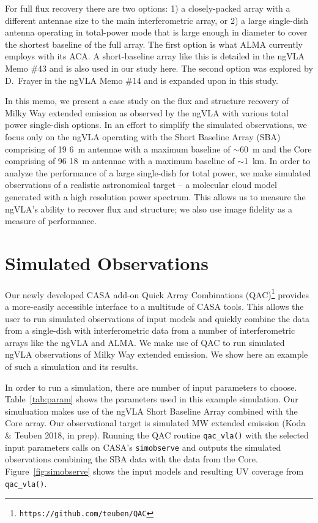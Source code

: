 \documentclass[12pt]{article}
\begin{document}
For full flux recovery there are two options: 1) a closely-packed array with a different antennae size to the main interferometric array, or 2) a large single-dish antenna operating in total-power mode that is large enough in diameter to cover the shortest baseline of the full array. The first option is what ALMA currently employs with its ACA. A short-baseline array like this is detailed in the ngVLA Memo \#43 and is also used in our study here. The second option was explored by D.~Frayer in the ngVLA Memo \#14 and is expanded upon in this study.

In this memo, we present a case study on the flux and structure recovery of Milky Way extended emission as observed by the ngVLA with various total power single-dish options. In an effort to simplify the simulated observations, we focus only on the ngVLA operating with the Short Baseline Array (SBA) comprising of 19 \SI{6}{\meter} antennae with a maximum baseline of $\sim$\SI{60}{\meter} and the Core comprising of 96 \SI{18}{\meter} antennae with a maximum baseline of $\sim$\SI{1}{\kilo\meter}. In order to analyze the performance of a large single-dish for total power, we make simulated observations of a realistic astronomical target -- a molecular cloud model generated with a high resolution power spectrum. This allows us to measure the ngVLA's ability to recover flux and structure; we also use image fidelity as a measure of performance. 

\section*{Simulated Observations}

Our newly developed CASA add-on Quick Array Combinations (QAC)\footnote{\texttt{https://github.com/teuben/QAC}} provides a more-easily accessible interface to a multitude of CASA tools. This allows the user to run simulated observations of input models and quickly combine the data from a single-dish with interferometric data from a number of interferometric arrays like the ngVLA and ALMA. We make use of QAC to run simulated ngVLA observations of Milky Way extended emission. We show here an example of such a simulation and its results. 

In order to run a simulation, there are number of input parameters to choose. Table~\ref{tab:param} shows the parameters used in this example simulation. Our simuluation makes use of the ngVLA Short Baseline Array combined with the Core array. Our observational target is simulated MW extended emission (Koda \& Teuben 2018, in prep). Running the QAC routine \texttt{qac\_vla()} with the selected input parameters calls on CASA's \texttt{simobserve} and outputs the simulated observations combining the SBA data with the data from the Core. Figure~\ref{fig:simobserve} shows the input models and resulting UV coverage from \texttt{qac\_vla()}. 
\end{document}
